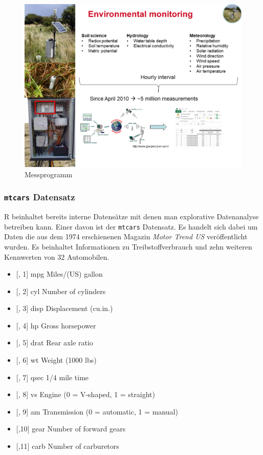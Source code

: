 \documentclass[
]{article}
\providecommand{\tightlist}{%
  \setlength{\itemsep}{0pt}\setlength{\parskip}{0pt}}
\begin{document}
\begin{figure}

{\centering \includegraphics[width=1\linewidth]{images/003} 

}

\caption{Messprogramm}\label{fig:unnamed-chunk-5}
\end{figure}

\hypertarget{mtcars-datensatz}{%
\subsubsection{\texorpdfstring{\texttt{mtcars} Datensatz}{mtcars Datensatz}}\label{mtcars-datensatz}}

R beinhaltet bereits interne Datensätze mit denen man explorative Datenanalyse betreiben kann. Einer davon ist der \texttt{mtcars} Datensatz. Es handelt sich dabei um Daten die aus dem 1974 erschienenen Magazin \emph{Motor Trend US} veröffentlicht wurden. Es beinhaltet Informationen zu Treibstoffverbrauch und zehn weiteren Kennwerten von 32 Automobilen.

\begin{itemize}
\tightlist
\item
  {[}, 1{]} mpg Miles/(US) gallon
\item
  {[}, 2{]} cyl Number of cylinders
\item
  {[}, 3{]} disp Displacement (cu.in.)
\item
  {[}, 4{]} hp Gross horsepower
\item
  {[}, 5{]} drat Rear axle ratio
\item
  {[}, 6{]} wt Weight (1000 lbs)
\item
  {[}, 7{]} qsec 1/4 mile time
\item
  {[}, 8{]} vs Engine (0 = V-shaped, 1 = straight)
\item
  {[}, 9{]} am Transmission (0 = automatic, 1 = manual)
\item
  {[},10{]} gear Number of forward gears
\item
  {[},11{]} carb Number of carburetors
\end{itemize}
\end{document}

